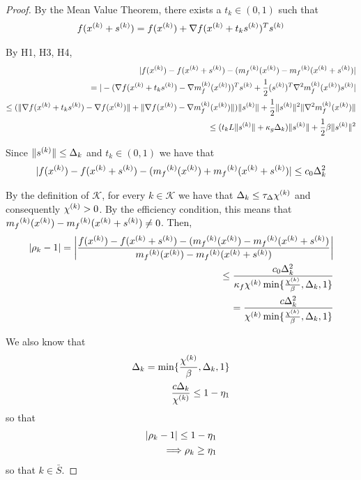 \begin{proof}

By the Mean Value Theorem, there exists a $t_k \in (0, 1)$ such that
\begin{align*}
f({x}^{(k)} + {{s}^{(k)}}) = f({x}^{(k)}) + \nabla f({x}^{(k)} + t_k{{s}^{(k)}})^T{{s}^{(k)}}
\end{align*}

By H1, H3, H4,
\begin{align*}
|f({x}^{(k)}) - f({x}^{(k)} + {{s}^{(k)}}) - ({{m}_f}^{(k)}({x}^{(k)}) - {{m}_f}^{(k)}({x}^{(k)} + {{s}^{(k)}})| \\
= |-(\nabla f({x}^{(k)} + t_k{{s}^{(k)}}) - {\nabla m_f^{(k)}(x^{(k)})})^T{{s}^{(k)}} + \frac 1 2 ({{s}^{(k)}})^T {\nabla^2m_f^{(k)}(x^{(k)})} {{s}^{(k)}}| \\
\le (\| \nabla f({x}^{(k)} + t_k{{s}^{(k)}}) - \nabla f({x}^{(k)}) \| + \| \nabla f({x}^{(k)})-{\nabla m_f^{(k)}(x^{(k)})} \|) \|{{s}^{(k)}}\| + \frac 1 2 \|{{s}^{(k)}}\|^2\|{\nabla^2m_f^{(k)}(x^{(k)})}\| \\
\le (t_k L \|{{s}^{(k)}}\| + \kappa_{g}\Delta_k) \|{{s}^{(k)}}\| + \frac 1 2 \beta \|{{s}^{(k)}}\|^2
\end{align*}

Since $\| {{s}^{(k)}} \| \le \Delta_k$ and $t_k \in (0, 1)$ we have that
\begin{align}
|f({x}^{(k)}) - f({x}^{(k)} + {{s}^{(k)}}) - ({{m}_f}^{(k)}({x}^{(k)}) + {{m}_f}^{(k)}({x}^{(k)} + {{s}^{(k)}})| \le c_0 \Delta_k^2
\end{align}

By the definition of $\mathcal K$, for every $k \in \mathcal K$ we have that $\Delta_k \le \tau_{\Delta} {\chi^{(k)}}$ and consequently ${\chi^{(k)}} > 0$.
By the efficiency condition, this means that ${{m}_f}^{(k)}({x}^{(k)}) - {{m}_f}^{(k)}({x}^{(k)} + {{s}^{(k)}}) \ne 0$.
Then,
\begin{align*}
|\rho_k - 1| = \bigg |\frac{f({x}^{(k)}) - f({x}^{(k)} + {{s}^{(k)}}) - ({{m}_f}^{(k)}({x}^{(k)}) - {{m}_f}^{(k)}({x}^{(k)} + {{s}^{(k)}})}{{{m}_f}^{(k)}({x}^{(k)}) - {{m}_f}^{(k)}({x}^{(k)} + {{s}^{(k)}})} \bigg | \\
\le \frac {c_0 \Delta_k^2} {\kappa_f {\chi^{(k)}} \min\{\frac{{\chi^{(k)}}}{\beta}, \Delta_k, 1\}} \\
= \frac {c \Delta_k^2} {{\chi^{(k)}} \min\{\frac{{\chi^{(k)}}}{\beta}, \Delta_k, 1\}}
\end{align*}

We also know that 
\begin{align*}
\Delta_k = \min\{\frac {{\chi^{(k)}}} {\beta}, \Delta_k, 1 \} \\
\frac {c \Delta_k}{{\chi^{(k)}}} \le 1 - \eta_1
\end{align*}
so that
\begin{align*}
|\rho_k - 1| \le 1 - \eta_1 \\
\Longrightarrow \rho_k \ge \eta_1
\end{align*}
so that $k \in \bar{S}$.


\end{proof}



